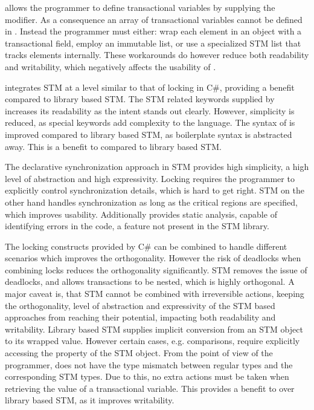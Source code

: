 \stmname allows the programmer to define transactional variables by supplying the  modifier. As a consequence an array of transactional variables cannot be defined in \stmname. Instead the programmer must either: wrap each element in an object with a transactional field, employ an immutable list, or use a specialized \ac{STM} list that tracks elements internally. These workarounds do however reduce both readability and writability, which negatively affects the usability of \stmname.

\stmname integrates \ac{STM} at a level similar to that of locking in C\#, providing a benefit compared to library based \ac{STM}. The \ac{STM} related keywords supplied by \stmname increases its readability as the intent stands out clearly. However, simplicity is  reduced, as special keywords add complexity to the language. The syntax of \stmname is improved compared to library based \ac{STM}, as boilerplate syntax is abstracted away. This is a benefit to \stmname compared to library based \ac{STM}. 

The declarative synchronization approach in \ac{STM} provides high simplicity, a high level of abstraction and high expressivity. Locking requires the programmer to explicitly control synchronization details, which is hard to get right. \ac{STM} on the other hand handles synchronization as long as the critical regions are specified, which improves usability. Additionally \stmname provides static analysis, capable of identifying errors in the code, a feature not present in the \ac{STM} library. 

The locking constructs provided by C\#  can be  combined to handle different scenarios which improves the orthogonality. However the risk of deadlocks when combining locks reduces the orthogonality significantly. \ac{STM} removes the issue of deadlocks, and allows transactions to be nested, which is highly orthogonal. A major caveat is, that \ac{STM} cannot be combined with irreversible actions, keeping the orthogonality, level of abstraction and expressivity of the \ac{STM} based approaches from reaching their potential, impacting both readability and writability. Library based \ac{STM} supplies implicit conversion from an \ac{STM} object to its wrapped value. However certain cases,  e.g. comparisons, require explicitly accessing the  property of the \ac{STM} object. From the point of view of the programmer, \stmname does not have the type mismatch between regular types and the corresponding \ac{STM} types. Due to this, no extra actions must be taken when retrieving the value of a transactional variable. This provides a benefit to \stmname over library based \ac{STM}, as it improves writability.

